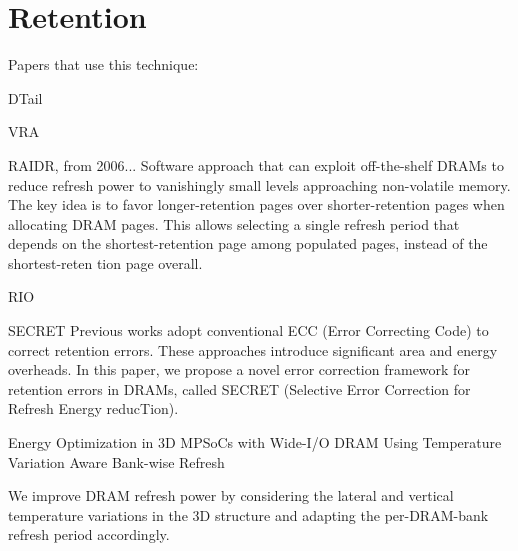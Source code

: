 \section{Retention}
\label{sec:ret}
Papers that use this technique:

DTail\cite{dtail}

VRA

RAIDR\cite{raidr}, from 2006...
Software approach that can exploit off-the-shelf DRAMs to reduce refresh power to vanishingly
small levels approaching non-volatile memory. The key idea is to favor longer-retention pages over shorter-retention pages when allocating DRAM pages. This allows selecting a single refresh period that depends on the shortest-retention page among populated pages,
instead of the shortest-reten tion page overall. 

RIO\cite{rioparis}

SECRET\cite{secret}
Previous works adopt conventional ECC (Error Correcting Code) to correct retention errors. These approaches introduce significant area and energy overheads. In this paper, we propose a novel error correction framework for retention errors in DRAMs, called SECRET (Selective Error Correction for Refresh Energy reducTion).

Energy Optimization in 3D MPSoCs with Wide-I/O DRAM Using Temperature Variation Aware Bank-wise Refresh

We improve DRAM refresh power by considering the lateral and vertical temperature
variations in the 3D structure and adapting the per-DRAM-bank refresh period accordingly.